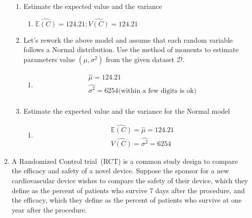 \documentclass[krantz1,ChapterTOCs]{krantz}
\begin{document}
\begin{enumerate}
\begin{enumerate}
        \item Estimate the expected value and the variance
        \begin{enumerate}
            \item {
            \color{red} 
                    $\hat{\mathbb{E}(C)} = 124.21;\hat{V(C)} = 124.21 $
            } 
        \end{enumerate}

        \item Let's rework the above model and assume that each random variable follows a Normal distribution. Use the method of moments to estimate parameters value $(\mu, \sigma^{2})$ from the given dataset $\mathcal{D}$.
        \begin{enumerate}
            \item {
            \color{red} 
         
            \begin{align}
                \hat{\mu} = 124.21 \\ 
                \hat{\sigma^{2}} = 6254 \text{(within a few digits is ok)} \\ 
            \end{align}
        
            } 
        \end{enumerate}

        \item Estimate the expected value and the variance for the Normal model
        \begin{enumerate}
            \item {
            \color{red} 
        
                \begin{align}
                    \hat{\mathbb{E}(C)} = \hat{\mu} = 124.21 \\ 
                    \hat{V(C)} = \hat{\sigma^{2}}   = 6254 
                \end{align}
        
            } 
        \end{enumerate}

    \end{enumerate}
    
    \item A Randomized Control trial~(RCT) is a common study design to compare the efficacy and safety of a novel device. Suppose the sponsor for a new cardiovascular device wishes to compare the safety of their device, which they define as the percent of patients who survive 7 days after the procedure, and the efficacy, which they define as the percent of patients who survive at one year after the procedure. \\ 
    

\end{enumerate}
\end{document}
